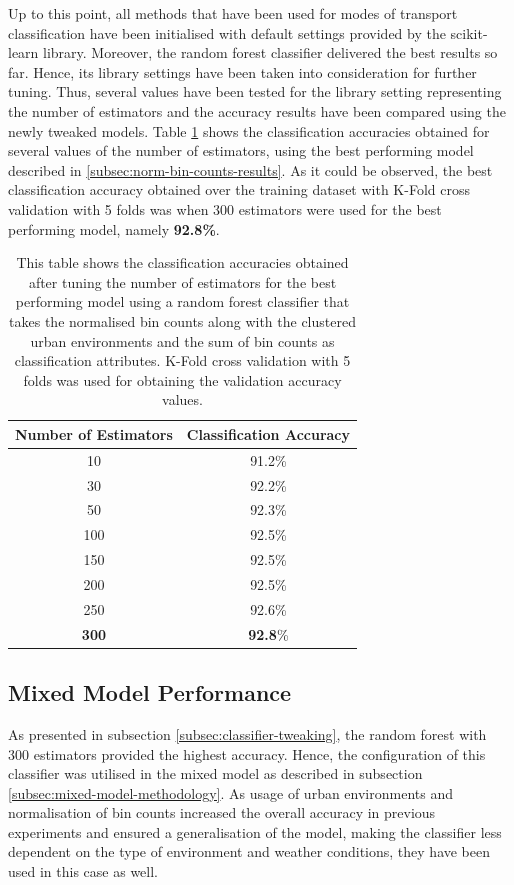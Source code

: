 \documentclass[bsc,frontabs,twoside,singlespacing,parskip,deptreport]{infthesis}     %
\begin{document}
Up to this point, all methods that have been used for modes of transport classification have been initialised with default settings provided by the scikit-learn library. Moreover, the random forest classifier delivered the best results so far. Hence, its library settings have been taken into consideration for further tuning. Thus, several values have been tested for the library setting representing the number of estimators and the accuracy results have been compared using the newly tweaked models. Table \ref{table:n-estimators} shows the classification accuracies obtained for several values of the number of estimators, using the best performing model described in \ref{subsec:norm-bin-counts-results}. As it could be observed, the best classification accuracy obtained over the training dataset with K-Fold cross validation with 5 folds was when 300 estimators were used for the best performing model, namely \textbf{92.8\%}.

\begin{table}[h!]
\centering
 \begin{tabular}{|| c | c ||} 
 \hline
 Number of Estimators & Classification Accuracy \\ [0.5ex] 
 \hline\hline
 10 & 91.2\% \\ 
 \hline
 30 & 92.2\% \\ 
 \hline
 50 & 92.3\% \\ 
 \hline
 100 & 92.5\% \\ 
 \hline
 150 & 92.5\% \\
 \hline
  200 & 92.5\% \\ 
 \hline
   250 & 92.6\% \\ 
 \hline
 \textbf{300} & \textbf{92.8}\% \\ 
 \hline
\end{tabular}
\caption{This table shows the classification accuracies obtained after tuning the number of estimators for the best performing model using a random forest classifier that takes the normalised bin counts along with the clustered urban environments and the sum of bin counts as classification attributes. K-Fold cross validation with 5 folds was used for obtaining the validation accuracy values.}
\label{table:n-estimators}
\end{table}


\subsection{Mixed Model Performance}

As presented in subsection \ref{subsec:classifier-tweaking}, the random forest with 300 estimators provided the highest accuracy. Hence, the configuration of this classifier was utilised in the mixed model as described in subsection \ref{subsec:mixed-model-methodology}. As usage of urban environments and normalisation of bin counts increased the overall accuracy in previous experiments and ensured a generalisation of the model, making the classifier less dependent on the type of environment and weather conditions, they have been used in this case as well. 
\end{document}
